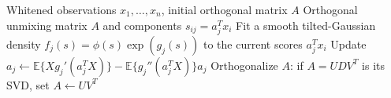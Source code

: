 \begin{breakablealgorithm}
\caption{Product-Density ICA Alternation}
\label{alg:sl-product-density-ica}
\begin{algorithmic}
\Require Whitened observations $x_1,\ldots,x_n$, initial orthogonal matrix $A$
\Ensure Orthogonal unmixing matrix $A$ and components $s_{ij}=a_j^Tx_i$
\Repeat
{}
\State Fit a smooth tilted-Gaussian density $f_j(s)=\phi(s)\exp(g_j(s))$ to the current scores $a_j^Tx_i$
\State Update $a_j\gets \mathbb{E}\{Xg_j'(a_j^TX)\}-\mathbb{E}\{g_j''(a_j^TX)\}a_j$
\EndFor
\State Orthogonalize $A$: if $A=UDV^T$ is its SVD, set $A\gets UV^T$
\end{algorithmic}
\end{breakablealgorithm}
